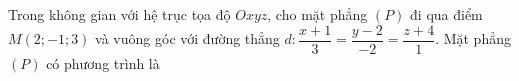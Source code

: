 \begin{ex}
Trong không gian với hệ trục tọa độ $Oxyz$, cho mặt phẳng $(P)$ đi qua điểm $M(2;-1;3)$ và vuông góc với đường thẳng $d\colon\dfrac{x+1}{3}=\dfrac{y-2}{-2}=\dfrac{z+4}{1}$. Mặt phẳng $(P)$ có phương trình là
\end{ex}
